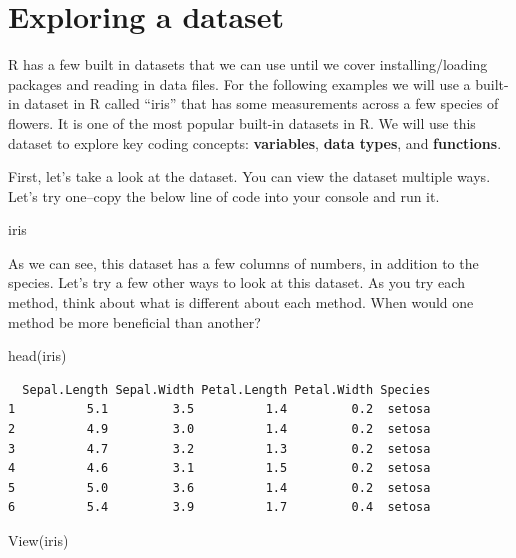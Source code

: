 \documentclass[
  letterpaper,
  DIV=11,
  numbers=noendperiod]{scrreprt}
\newenvironment{Shaded}{\begin{snugshade}}{\end{snugshade}}
\newcommand{\FunctionTok}[1]{\textcolor[rgb]{0.28,0.35,0.67}{#1}}
\newcommand{\NormalTok}[1]{\textcolor[rgb]{0.00,0.23,0.31}{#1}}
\begin{document}
\hypertarget{exploring-a-dataset}{%
\section{Exploring a dataset}\label{exploring-a-dataset}}

R has a few built in datasets that we can use until we cover
installing/loading packages and reading in data files. For the following
examples we will use a built-in dataset in R called ``iris'' that has
some measurements across a few species of flowers. It is one of the most
popular built-in datasets in R. We will use this dataset to explore key
coding concepts: \textbf{variables}, \textbf{data types}, and
\textbf{functions}.

First, let's take a look at the dataset. You can view the dataset
multiple ways. Let's try one--copy the below line of code into your
console and run it.

\begin{Shaded}
\begin{Highlighting}[]
\NormalTok{iris}
\end{Highlighting}
\end{Shaded}

As we can see, this dataset has a few columns of numbers, in addition to
the species. Let's try a few other ways to look at this dataset. As you
try each method, think about what is different about each method. When
would one method be more beneficial than another?

\begin{Shaded}
\begin{Highlighting}[]
\FunctionTok{head}\NormalTok{(iris)}
\end{Highlighting}
\end{Shaded}

\begin{verbatim}
  Sepal.Length Sepal.Width Petal.Length Petal.Width Species
1          5.1         3.5          1.4         0.2  setosa
2          4.9         3.0          1.4         0.2  setosa
3          4.7         3.2          1.3         0.2  setosa
4          4.6         3.1          1.5         0.2  setosa
5          5.0         3.6          1.4         0.2  setosa
6          5.4         3.9          1.7         0.4  setosa
\end{verbatim}

\begin{Shaded}
\begin{Highlighting}[]
\FunctionTok{View}\NormalTok{(iris)}
\end{Highlighting}
\end{Shaded}
\end{document}
